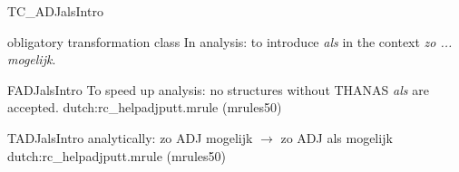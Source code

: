 \begin{mruleclass}{TC\_ADJalsIntro}
\begin{classdescr}
\kind obligatory transformation class
\classtask In analysis: to introduce {\em als} in the context 
{\em zo ... mogelijk}. 
\classremarks\mbox{} 

\begin{filters}
\begin{member}
 FADJalsIntro
 To speed up analysis: no structures
without THANAS {\em als} are accepted.
\file dutch:rc\_helpadjputt.mrule (mrules50)
\end{member}

\end{filters} 

\nospeedrules

\noplannedrules

\norulesnotince


\end{classdescr}
\begin{members}
\begin{member}
 TADJalsIntro
\example analytically: zo ADJ  mogelijk  $\rightarrow$ zo ADJ als mogelijk
\file dutch:rc\_helpadjputt.mrule (mrules50)
\semantics \nosemantics
\remarks\mbox{}

\end{member}
\end{members}
\end{mruleclass}



